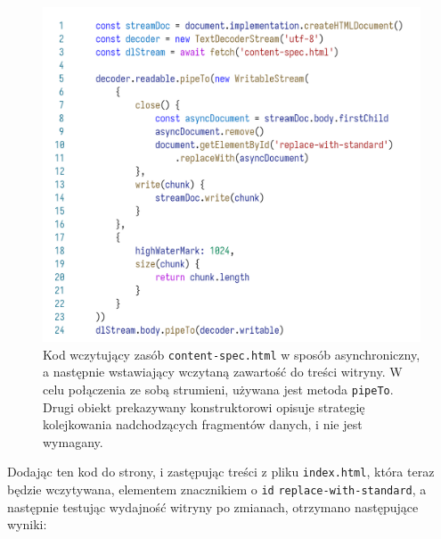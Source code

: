 \documentclass[licencjacka]{pracadypl}
\begin{document}
\begin{figure}[H]
  \centering
  \includegraphics[width=\linewidth]{images/code-js-async-streaming.png}
  \caption{Kod wczytujący zasób \texttt{content-spec.html} w sposób asynchroniczny, a następnie wstawiający wczytaną zawartość do treści witryny. W celu połączenia ze sobą strumieni, używana jest metoda \texttt{pipeTo}. Drugi obiekt prekazywany konstruktorowi opisuje strategię kolejkowania nadchodzących fragmentów danych, i nie jest wymagany.}
  \label{fig:code-js-async-streaming}
\end{figure}

Dodając ten kod do strony, i zastępując treści z pliku \texttt{index.html}, która teraz będzie wczytywana, elementem znacznikiem o \texttt{id} \texttt{replace-with-standard}, a następnie testując wydajność witryny po zmianach, otrzymano następujące wyniki:
\end{document}
